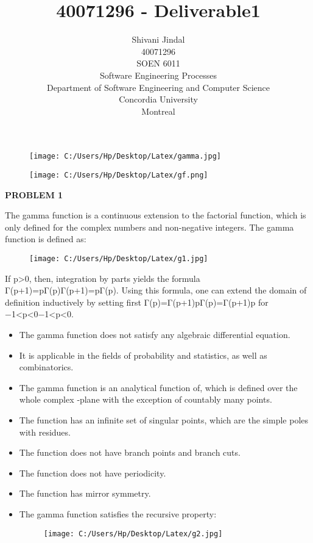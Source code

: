 \documentclass[11pt]{article}
\begin{document}
\title{40071296 - Deliverable1}

\LARGE{\author{
	Shivani Jindal \\
	40071296\\
	SOEN 6011\\
	Software Engineering Processes\\
	Department of Software Engineering and Computer Science\\
	Concordia University\\
	Montreal }}
\maketitle

\begin{figure} [h]
	\centering
	\texttt{[image: C:/Users/Hp/Desktop/Latex/gamma.jpg]}
\end{figure}

\begin{figure}[h]
	\centering
	\texttt{[image: C:/Users/Hp/Desktop/Latex/gf.png]}
\end{figure}

\onehalfspacing

\newpage
\tableofcontents
\newpage


{\bfseries{PROBLEM 1 } }

The gamma function is a continuous extension to the factorial function, which is only defined for the complex numbers and non-negative integers. The gamma function is defined as:
\begin{figure} [h]
	\centering
	\texttt{[image: C:/Users/Hp/Desktop/Latex/g1.jpg]}
\end{figure} 
\newline
If p>0, then, integration by parts yields the formula Γ(p+1)=pΓ(p)Γ(p+1)=pΓ(p). Using this formula, one can extend the domain of definition inductively by setting first Γ(p)=Γ(p+1)pΓ(p)=Γ(p+1)p for −1<p<0−1<p<0.
\begin{itemize}
	\item The gamma function does not satisfy any algebraic differential equation.
	\item It is applicable in the fields of probability and statistics, as well as combinatorics.
\item The gamma function  is an analytical function of, which is defined over the whole complex ‐plane with the exception of countably many points.
\item The function has an infinite set of singular points, which are the simple poles with residues. 
\item The function  does not have branch points and branch cuts.
\item The function  does not have periodicity.
\item The function  has mirror symmetry.
\item The gamma function satisfies the recursive property:
\begin{figure} [h]
	\centering
	\texttt{[image: C:/Users/Hp/Desktop/Latex/g2.jpg]}
\end{figure}
\end{itemize}
\end{document}
